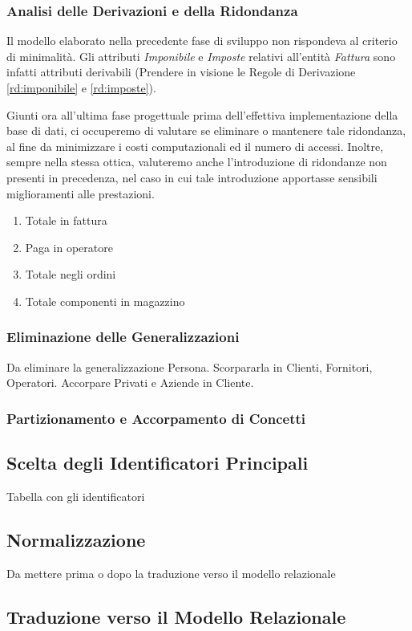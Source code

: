 		\subsubsection{Analisi delle Derivazioni e della Ridondanza}

			Il modello elaborato nella precedente fase di sviluppo non rispondeva al criterio di minimalità. Gli attributi \emph{Imponibile} e \emph{Imposte} relativi all'entità \emph{Fattura} sono infatti attributi derivabili (Prendere in visione le Regole di Derivazione \ref{rd:imponibile} e \ref{rd:imposte}).

			Giunti ora all'ultima fase progettuale prima dell'effettiva implementazione della base di dati, ci occuperemo di valutare se eliminare o mantenere tale ridondanza, al fine da minimizzare i costi computazionali ed il numero di accessi. Inoltre, sempre nella stessa ottica, valuteremo anche l'introduzione di ridondanze non presenti in precedenza, nel caso in cui tale introduzione apportasse sensibili miglioramenti alle prestazioni.

			\begin{enumerate}
				\item Totale in fattura
				\item Paga in operatore
				\item Totale negli ordini 
				\item Totale componenti in magazzino
			\end{enumerate}
			
		\subsubsection{Eliminazione delle Generalizzazioni}
			
			Da eliminare la generalizzazione Persona. Scorpararla in Clienti, Fornitori, Operatori. Accorpare Privati e Aziende in Cliente.
			
		\subsubsection{Partizionamento e Accorpamento di Concetti}
	\subsection{Scelta degli Identificatori Principali}
		
		Tabella con gli identificatori
		
	\subsection{Normalizzazione}
		Da mettere prima o dopo la traduzione verso il modello relazionale
	\subsection{Traduzione verso il Modello Relazionale}
